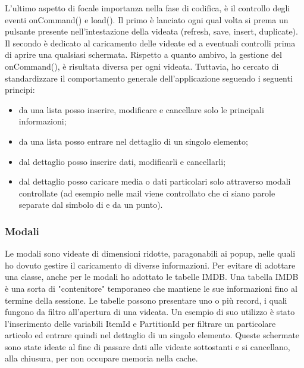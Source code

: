 L'ultimo aspetto di focale importanza nella fase di codifica, è il controllo degli eventi onCommand() e load(). Il primo è lanciato ogni qual volta si prema un pulsante presente nell'intestazione della videata (refresh, save, insert, duplicate).  Il secondo è dedicato al caricamento delle videate ed a eventuali controlli prima di aprire una qualsiasi schermata.
Rispetto a quanto ambivo, la gestione del onCommand(), è risultata diversa per ogni videata.  Tuttavia, ho cercato di standardizzare il comportamento generale dell'applicazione seguendo i seguenti principi:
\begin{itemize}
	\item da una lista posso inserire, modificare e cancellare solo le principali informazioni;
	\item da una lista posso entrare nel dettaglio di un singolo elemento;
	\item dal dettaglio posso inserire dati, modificarli e cancellarli;
	\item dal dettaglio posso caricare media o dati particolari solo attraverso modali controllate (ad esempio nelle mail viene controllato che ci siano parole separate dal simbolo di \@ e da un punto).
\end{itemize}


\subsubsection{Modali}
Le modali sono videate di dimensioni ridotte, paragonabili ai popup, nelle quali ho dovuto gestire il caricamento di diverse informazioni. Per evitare di adottare una classe, anche per le modali ho adottato le tabelle IMDB. 
Una tabella IMDB è una sorta di "contenitore" temporaneo che mantiene le sue informazioni fino al termine della sessione. Le tabelle possono presentare uno o più record, i quali fungono da filtro all'apertura di una videata. Un esempio di suo utilizzo è stato l'inserimento delle variabili ItemId e PartitionId per filtrare un particolare articolo ed entrare quindi nel dettaglio di un singolo elemento.
Queste schermate sono state ideate al fine di passare dati alle videate sottostanti e si cancellano, alla chiusura, per non occupare memoria nella cache.


